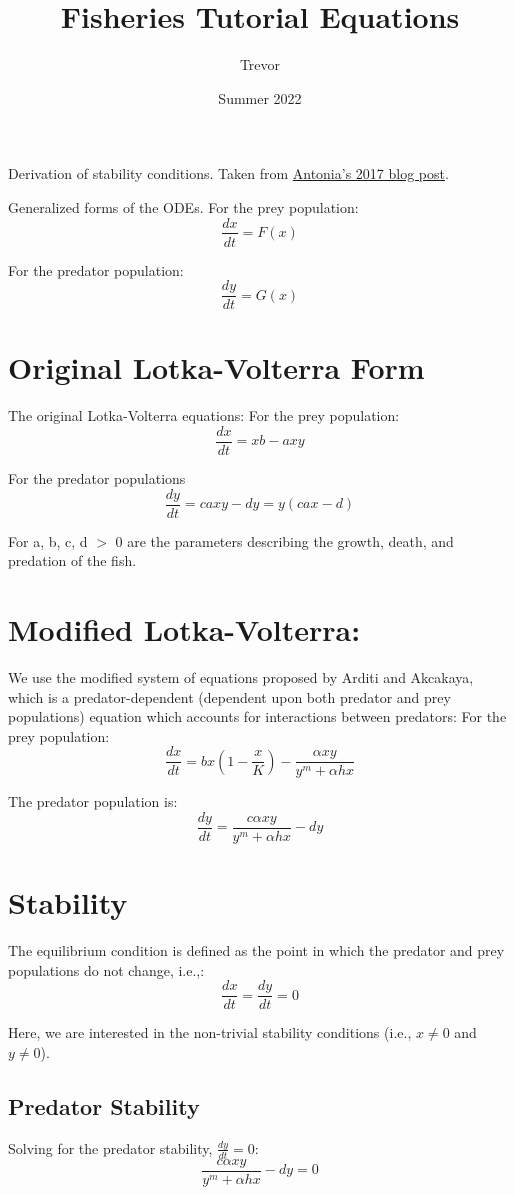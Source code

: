 \documentclass{article}
\title{Fisheries Tutorial Equations}
\author{Trevor}
\date{Summer 2022}
\begin{document}
\maketitle

Derivation of stability conditions. Taken from \href{https://waterprogramming.wordpress.com/2017/09/22/exploring-the-stability-of-systems-of-ordinary-differential-equations-an-example-using-the-lotka-volterra-system-of-equations/}{Antonia's 2017 blog post}.


Generalized forms of the ODEs. 
\bigbreak For the prey population:
$$\frac{dx}{dt} = F(x)$$

For the predator population:
$$\frac{dy}{dt} = G(x)$$

\section{Original Lotka-Volterra Form}
The original Lotka-Volterra equations:
\bigbreak For the prey population:
$$\frac{dx}{dt} = xb - axy$$

For the predator populations
$$\frac{dy}{dt} = caxy - dy = y(cax - d)$$

\bigbreak For a, b, c, d $>$ 0 are the parameters describing the
growth, death, and predation of the fish.

\section{Modified Lotka-Volterra:}
We use the modified system of equations proposed by Arditi and Akcakaya, which is a predator-dependent (dependent upon both predator and prey populations) equation which accounts for interactions between predators:
\bigbreak For the prey population:
$$\frac{dx}{dt} = bx(1-\frac{x}{K}) - \frac{\alpha xy}{y^m + \alpha hx}$$

\bigbreak The predator population is:
$$ \frac{dy}{dt} = \frac{c\alpha xy}{y^m + \alpha hx} -dy $$

\section{Stability}
The equilibrium condition is defined as the point in which the predator and prey populations do not change, i.e.,:
$$\frac{dx}{dt} = \frac{dy}{dt} = 0$$

\bigbreak Here, we are interested in the non-trivial stability conditions (i.e., $x \neq 0$ and $y \neq 0$). 

\subsection{Predator Stability}
Solving for the predator stability, $\frac{dy}{dt} = 0$:
$$\frac{c\alpha xy}{y^m + \alpha hx} -dy = 0$$
\end{document}
